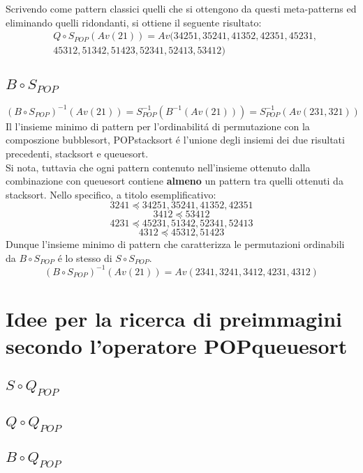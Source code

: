 Scrivendo come pattern classici quelli che si ottengono da questi meta-patterns ed eliminando quelli ridondanti, si ottiene il seguente risultato:
\begin{eqnarray*}
&Q\circ{S_{POP}}(Av(21)) = Av(34251, 35241, 41352, 42351, 45231, \\
& 45312, 51342, 51423, 52341, 52413, 53412)
\end{eqnarray*}
\subsection*{$B\circ{S_{POP}}$}
$$(B\circ{S}_{POP})^{-1}(Av(21)) = S_{POP}^{-1}(B^{-1}(Av(21))) = S_{POP}^{-1}(Av(231,321))$$
Il l'insieme minimo di pattern per l'ordinabilit\'a di permutazione con la composzione bubblesort, POPstacksort \'e l'unione degli insiemi dei due risultati precedenti, stacksort e queuesort.\\
Si nota, tuttavia che ogni pattern contenuto nell'insieme ottenuto dalla combinazione con queuesort contiene \textbf{almeno} un pattern tra quelli ottenuti da stacksort. Nello specifico, a titolo esemplificativo:$$3241\preceq34251, 35241, 41352, 42351$$$$3412\preceq53412$$$$4231\preceq45231, 51342, 52341, 52413$$$$4312\preceq45312, 51423$$ 
Dunque l'insieme minimo di pattern che caratterizza le permutazioni ordinabili da $B\circ{S}_{POP}$ \'e lo stesso di $S\circ{S}_{POP}$.
$$(B\circ{S_{POP}})^{-1}(Av(21)) = Av(2341, 3241, 3412, 4231, 4312)$$
\section*{Idee per la ricerca di preimmagini secondo l'operatore POPqueuesort}
\subsection*{$S\circ{Q_{POP}}$}
\subsection*{$Q\circ{Q_{POP}}$}
\subsection*{$B\circ{Q_{POP}}$}
